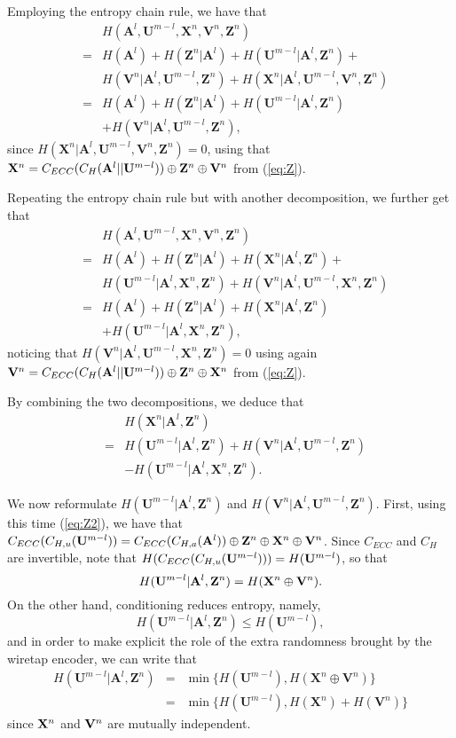 \documentclass{article}[11pt]
\newcommand{\am}{\mathbf{A}}
\newcommand{\um}{\mathbf{U}}
\newcommand{\vm}{\mathbf{V}}
\newcommand{\xm}{\mathbf{X}}
\newcommand{\zm}{\mathbf{Z}}
\newenvironment{proof}{\noindent {\bf Proof. \ }}{\hfill \vrule height 2pt depth 4pt width 6pt\par\noindent}
\begin{document}
\begin{proof}
Employing the entropy chain rule, we have that
\begin{eqnarray*}
& & H(\am^l,\um^{m-l},\xm^n,\vm^n,\zm^n) \\
&=& H(\am^l) + H(\zm^n|\am^l) + H(\um^{m-l}|\am^l,\zm^n)+\\
& & H(\vm^n|\am^l,\um^{m-l},\zm^n) + H(\xm^n|\am^l,\um^{m-l},\vm^n,\zm^n)\\
&=& H(\am^l) + H(\zm^n|\am^l) + H(\um^{m-l}|\am^l,\zm^n)\\
& &  + H(\vm^n|\am^l,\um^{m-l},\zm^n),
\end{eqnarray*}
since $H(\xm^n|\am^l,\um^{m-l},\vm^n,\zm^n)=0$, using that
${\bf X}^n = C_{ECC}(C_H({\bf A}^l||{\bf U}^{m-l}))\oplus{\bf Z}^n \oplus{\bf V}^n$
from (\ref{eq:Z}).

Repeating the entropy chain rule but with another decomposition,
we further get that
\begin{eqnarray*}
& & H(\am^l,\um^{m-l},\xm^n,\vm^n,\zm^n) \\
&=& H(\am^l) + H(\zm^n|\am^l) + H(\xm^n|\am^l,\zm^n)+\\
& & H(\um^{m-l}|\am^l,\xm^n,\zm^n) + H(\vm^n|\am^l,\um^{m-l},\xm^n,\zm^n)\\
&=& H(\am^l) + H(\zm^n|\am^l) + H(\xm^n|\am^l,\zm^n)\\
& &  + H(\um^{m-l}|\am^l,\xm^n,\zm^n),
\end{eqnarray*}
noticing that $H(\vm^n|\am^l,\um^{m-l},\xm^n,\zm^n)=0$ using again
${\bf V}^n = C_{ECC}(C_H({\bf A}^l||{\bf U}^{m-l}))\oplus{\bf Z}^n \oplus{\bf X}^n$
from (\ref{eq:Z}).

By combining the two decompositions, we deduce that
\begin{eqnarray*}
&& H(\xm^n|\am^l,\zm^n)\\
&=& H(\um^{m-l}|\am^l,\zm^n) + H(\vm^n|\am^l,\um^{m-l},\zm^n) \\
&&  - H(\um^{m-l}|\am^l,\xm^n,\zm^n).
\end{eqnarray*}

We now reformulate $H(\um^{m-l}|\am^l,\zm^n)$ and
$H(\vm^n|\am^l,\um^{m-l},\zm^n)$.
First, using this time (\ref{eq:Z2}), we have that
$C_{ECC}(C_{H,u}({\bf U}^{m-l})) = C_{ECC}(C_{H,a}({\bf A}^l))\oplus {\bf Z}^n
\oplus{\bf X}^n \oplus {\bf V}^n$. Since $C_{ECC}$ and $C_H$ are invertible, note
that $H(C_{ECC}(C_{H,u}({\bf U}^{m-l})))=H({\bf U}^{m-l})$, so that
\[
H(\um^{m-l}|\am^l,\zm^n)=H({\bf X}^n \oplus {\bf V}^n ).
\]
On the other hand, conditioning reduces entropy, namely,
\[
H(\um^{m-l}|\am^l,\zm^n)\leq H(\um^{m-l}),
\]
and in order to make explicit the role of the extra randomness brought by the wiretap
encoder, we can write that
\begin{eqnarray*}
H(\um^{m-l}|\am^l,\zm^n) &=& \min \{H(\um^{m-l}), H(\xm^n\oplus\vm^n) \}\\
                        &=& \min \{H(\um^{m-l}), H(\xm^n) + H(\vm^n) \}
\end{eqnarray*}
since ${\bf X}^n$ and ${\bf V}^n$ are mutually independent.


\end{proof}
\end{document}
